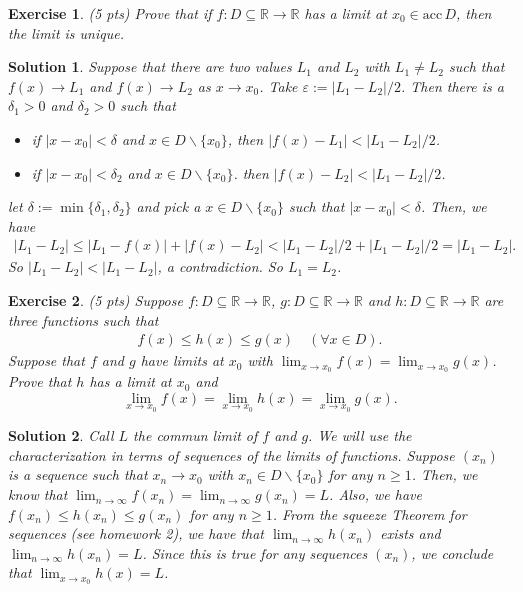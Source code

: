 \documentclass[12pt]{article}
\newcommand{\bR}{\mathbb{R}}
\newcommand{\ra}{\rightarrow}
\theoremstyle{plain}
\newtheorem{exer}{\textbf{Exercise}}}
\theoremstyle{plain}
\newtheorem*{sol}{\textbf{Solution}}}
\theoremstyle{plain}
\theoremstyle{plain}
\begin{document}
\begin{exer}
(5 pts)
Prove that if $f : D \subseteq \bR \ra \bR$ has a limit at $x_0 \in \mathrm{acc}\, D$, then the limit is unique.
\end{exer}
\begin{sol}
Suppose that there are two values $L_1$ and $L_2$ with $L_1 \neq L_2$ such that $f(x) \ra L_1$ and $f(x) \ra L_2$ as $x \ra x_0$. Take $\varepsilon := |L_1 - L_2|/2$. Then there is a $\delta_1 > 0$ and $\delta_2 > 0$ such that 
	\begin{itemize}
	\item if $|x - x_0| < \delta$ and $x \in D \backslash \{ x_0 \}$, then $|f(x) - L_1| < |L_1 - L_2|/2$.
	\item if $|x - x_0| < \delta_2$ and $x \in D \backslash \{ x_0 \}$. then $|f(x) - L_2| < |L_1 - L_2|/2$.
	\end{itemize}
let $\delta := \min \{ \delta_1 , \delta_2 \}$ and pick a $x \in D\backslash \{ x_0 \}$ such that $|x - x_0| < \delta$. Then, we have
	\begin{align*}
	|L_1 - L_2| \leq |L_1 - f(x)| + |f(x) - L_2| < |L_1 - L_2|/2 + |L_1 - L_2|/2 = |L_1 - L_2| .
	\end{align*}
So $|L_1 - L_2| < |L_1 - L_2|$, a contradiction. So $L_1 = L_2$.
\end{sol}

\begin{exer}
(5 pts)
Suppose $f: D \subseteq \bR \ra \bR$, $g: D \subseteq \bR \ra \bR$ and $h : D \subseteq \bR \ra \bR$ are three functions such that
	\begin{align*}
	f(x) \leq h(x) \leq g(x) \quad (\forall x \in D ) .
	\end{align*}
Suppose that $f$ and $g$ have limits at $x_0$ with $\lim_{x \ra x_0} f(x) = \lim_{x \ra x_0} g(x)$. Prove that $h$ has a limit at $x_0$ and
	$$
	\lim_{x \ra x_0} f(x) = \lim_{x \ra x_0} h(x) = \lim_{x \ra x_0} g(x) .
	$$
\end{exer}
\begin{sol}
Call $L$ the commun limit of $f$ and $g$. We will use the characterization in terms of sequences of the limits of functions. Suppose $(x_n)$ is a sequence such that $x_n \ra x_0$ with $x_n \in D \backslash \{ x_0 \}$ for any $n \geq 1$. Then, we know that $\lim_{n\ra \infty} f(x_n) = \lim_{n \ra \infty} g(x_n) = L$. Also, we have $f(x_n) \leq h(x_n) \leq g(x_n)$ for any $n \geq 1$. From the squeeze Theorem for sequences (see homework 2), we have that $\lim_{n \ra \infty} h(x_n)$ exists and $\lim_{n \ra \infty} h(x_n) = L$. Since this is true for any sequences $(x_n)$, we conclude that $\lim_{x \ra x_0} h(x) = L$.
\end{sol}
\end{document}
